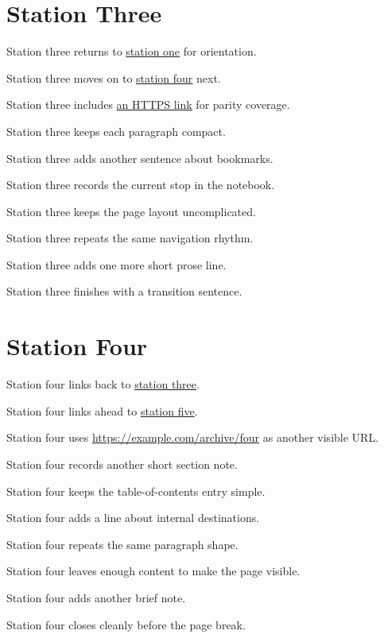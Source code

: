 \documentclass{article}
\begin{document}
\section{Station Three}
\label{sec:station-three}
Station three returns to \hyperref[sec:station-one]{station one} for orientation.\par
Station three moves on to \hyperref[sec:station-four]{station four} next.\par
Station three includes \href{https://example.com/three}{an HTTPS link} for parity coverage.\par
Station three keeps each paragraph compact.\par
Station three adds another sentence about bookmarks.\par
Station three records the current stop in the notebook.\par
Station three keeps the page layout uncomplicated.\par
Station three repeats the same navigation rhythm.\par
Station three adds one more short prose line.\par
Station three finishes with a transition sentence.\par
\newpage

\section{Station Four}
\label{sec:station-four}
Station four links back to \hyperref[sec:station-three]{station three}.\par
Station four links ahead to \hyperref[sec:station-five]{station five}.\par
Station four uses \url{https://example.com/archive/four} as another visible URL.\par
Station four records another short section note.\par
Station four keeps the table-of-contents entry simple.\par
Station four adds a line about internal destinations.\par
Station four repeats the same paragraph shape.\par
Station four leaves enough content to make the page visible.\par
Station four adds another brief note.\par
Station four closes cleanly before the page break.\par
\newpage
\end{document}
